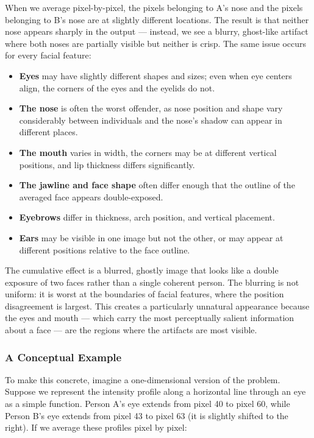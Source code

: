 When we average pixel-by-pixel, the pixels belonging to A's nose and the pixels belonging to B's
nose are at slightly different locations. The result is that neither nose appears sharply in the
output --- instead, we see a blurry, ghost-like artifact where both noses are partially visible but
neither is crisp. The same issue occurs for every facial feature:

\begin{itemize}
    \item \textbf{Eyes} may have slightly different shapes and sizes; even when eye centers align,
    the corners of the eyes and the eyelids do not.
    \item \textbf{The nose} is often the worst offender, as nose position and shape vary
    considerably between individuals and the nose's shadow can appear in different places.
    \item \textbf{The mouth} varies in width, the corners may be at different vertical positions,
    and lip thickness differs significantly.
    \item \textbf{The jawline and face shape} often differ enough that the outline of the averaged
    face appears double-exposed.
    \item \textbf{Eyebrows} differ in thickness, arch position, and vertical placement.
    \item \textbf{Ears} may be visible in one image but not the other, or may appear at different
    positions relative to the face outline.
\end{itemize}

The cumulative effect is a blurred, ghostly image that looks like a double exposure of two faces
rather than a single coherent person. The blurring is not uniform: it is worst at the boundaries of
facial features, where the position disagreement is largest. This creates a particularly
unnatural appearance because the eyes and mouth --- which carry the most perceptually salient
information about a face --- are the regions where the artifacts are most visible.

\subsubsection{A Conceptual Example}

To make this concrete, imagine a one-dimensional version of the problem. Suppose we represent the
intensity profile along a horizontal line through an eye as a simple function. Person A's eye
extends from pixel 40 to pixel 60, while Person B's eye extends from pixel 43 to pixel 63 (it is
slightly shifted to the right). If we average these profiles pixel by pixel:

